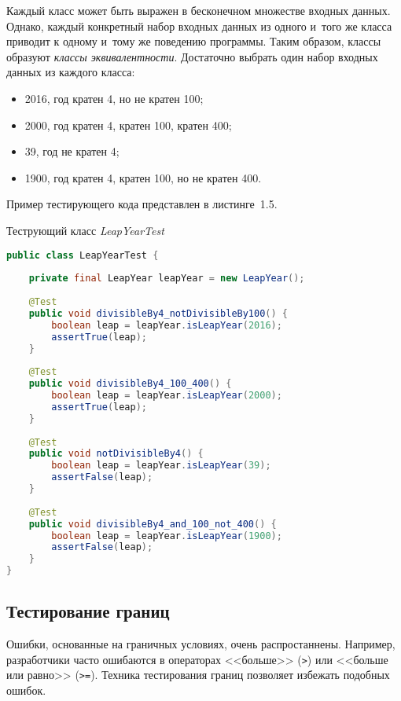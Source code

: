 Каждый класс может быть выражен в бесконечном множестве входных данных. Однако, каждый конкретный набор входных данных из одного и~того же класса приводит к одному и~тому же поведению программы. Таким образом, классы образуют \textit{классы эквивалентности}. Достаточно выбрать один набор входных данных из каждого класса:

 \begin{itemize}
	\item 2016, год кратен 4, но не кратен 100;
	\item 2000, год кратен 4, кратен 100, кратен 400;
	\item 39, год не кратен 4;
	\item 1900, год кратен 4, кратен 100, но не кратен 400.
\end{itemize}

Пример тестирующего кода представлен в листинге~1.5.

\begin{ListingEnv}[!h]%
	\captiondelim{ } %
	\caption{Теструющий класс \textit{LeapYearTest}}
	\begin{lstlisting}[language={Java}]
public class LeapYearTest {
	
	private final LeapYear leapYear = new LeapYear();
	
	@Test
	public void divisibleBy4_notDivisibleBy100() {
		boolean leap = leapYear.isLeapYear(2016);
		assertTrue(leap);
	}
	
	@Test
	public void divisibleBy4_100_400() {
		boolean leap = leapYear.isLeapYear(2000);
		assertTrue(leap);
	}
	
	@Test
	public void notDivisibleBy4() {
		boolean leap = leapYear.isLeapYear(39);
		assertFalse(leap);
	}
	
	@Test
	public void divisibleBy4_and_100_not_400() {
		boolean leap = leapYear.isLeapYear(1900);
		assertFalse(leap);
	}
}
	\end{lstlisting}
\end{ListingEnv}%



\subsection{Тестирование границ} 
 
Ошибки, основанные на граничных условиях, очень распростаннены. Например, разработчики часто ошибаются в операторах <<больше>> (\texttt{>}) или <<больше или равно>> (\texttt{>=}). Техника тестирования границ позволяет избежать подобных ошибок.

